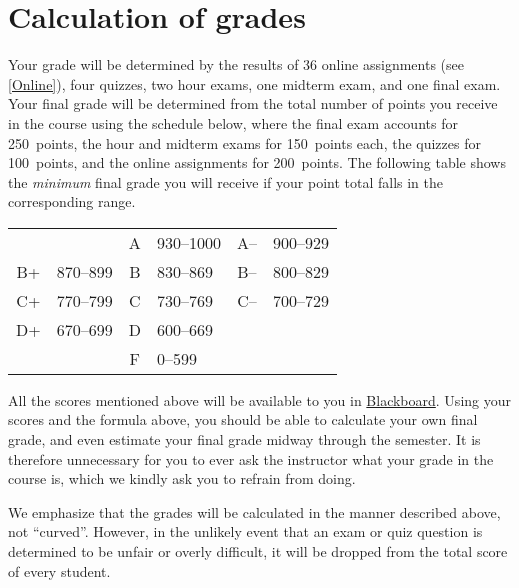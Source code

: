 \documentclass[11pt]{article}
\begin{document}
\section{Calculation of grades}\label{Assessment}
Your grade will be determined by the results of 
36 online assignments (see \autoref{Online}),
four quizzes, two hour exams, one midterm exam, and one 
final exam.
Your final grade will be determined from the total
number of points you receive in the course using the schedule below,
where the final exam accounts for 250~points,
the hour and midterm exams for 150~points each,
the quizzes for 100~points,
and the online assignments for 200~points.
The following table shows the {\em minimum} final grade you will receive
if your point total falls in the corresponding range.
\begin{center}\begin{tabular}{clclcl}
&&A&930--1000
&A--&900--929\\
B+&870--899\qquad\qquad
&B&830--869\qquad\qquad
&B--&800--829\\
C+&770--799
&C&730--769
&C--&700--729\\
D+&670--699
&D&600--669\\
&&F&0--599
\end{tabular}\end{center}
All the scores mentioned above will be available to you in
\href{https://bb.its.iastate.edu}{Blackboard}. Using your scores
and the formula above, you should be able to calculate your own final grade,
and even estimate your final grade midway through the semester.
It is therefore unnecessary for you to ever ask the instructor
what your grade in the course is, which we kindly ask you to refrain from
doing.

We emphasize that the grades will be calculated in the manner described
above, not ``curved''.
However, in the unlikely event that an exam or quiz question is determined
to be unfair or overly difficult, it will be dropped from the total score of
every student.
\end{document}

